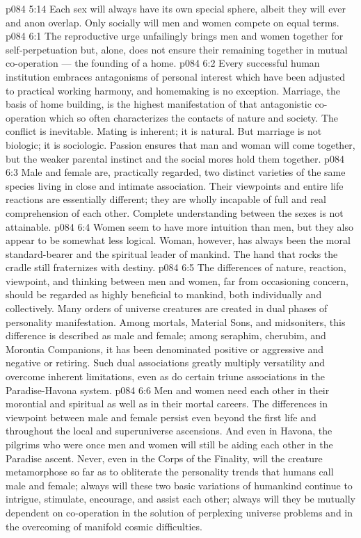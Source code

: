 \vs p084 5:14 Each sex will always have its own special sphere, albeit they will ever and anon overlap. Only socially will men and women compete on equal terms.
\vs p084 6:1 The reproductive urge unfailingly brings men and women together for self\hyp{}perpetuation but, alone, does not ensure their remaining together in mutual co\hyp{}operation --- the founding of a home.
\vs p084 6:2 Every successful human institution embraces antagonisms of personal interest which have been adjusted to practical working harmony, and homemaking is no exception. Marriage, the basis of home building, is the highest manifestation of that antagonistic co\hyp{}operation which so often characterizes the contacts of nature and society. The conflict is inevitable. Mating is inherent; it is natural. But marriage is not biologic; it is sociologic. Passion ensures that man and woman will come together, but the weaker parental instinct and the social mores hold them together.
\vs p084 6:3 \pc Male and female are, practically regarded, two distinct varieties of the same species living in close and intimate association. Their viewpoints and entire life reactions are essentially different; they are wholly incapable of full and real comprehension of each other. Complete understanding between the sexes is not attainable.
\vs p084 6:4 Women seem to have more intuition than men, but they also appear to be somewhat less logical. Woman, however, has always been the moral standard\hyp{}bearer and the spiritual leader of mankind. The hand that rocks the cradle still fraternizes with destiny.
\vs p084 6:5 \pc The differences of nature, reaction, viewpoint, and thinking between men and women, far from occasioning concern, should be regarded as highly beneficial to mankind, both individually and collectively. Many orders of universe creatures are created in dual phases of personality manifestation. Among mortals, Material Sons, and midsoniters, this difference is described as male and female; among seraphim, cherubim, and Morontia Companions, it has been denominated positive or aggressive and negative or retiring. Such dual associations greatly multiply versatility and overcome inherent limitations, even as do certain triune associations in the Paradise\hyp{}Havona system.
\vs p084 6:6 Men and women need each other in their morontial and spiritual as well as in their mortal careers. The differences in viewpoint between male and female persist even beyond the first life and throughout the local and superuniverse ascensions. And even in Havona, the pilgrims who were once men and women will still be aiding each other in the Paradise ascent. Never, even in the Corps of the Finality, will the creature metamorphose so far as to obliterate the personality trends that humans call male and female; always will these two basic variations of humankind continue to intrigue, stimulate, encourage, and assist each other; always will they be mutually dependent on co\hyp{}operation in the solution of perplexing universe problems and in the overcoming of manifold cosmic difficulties.
